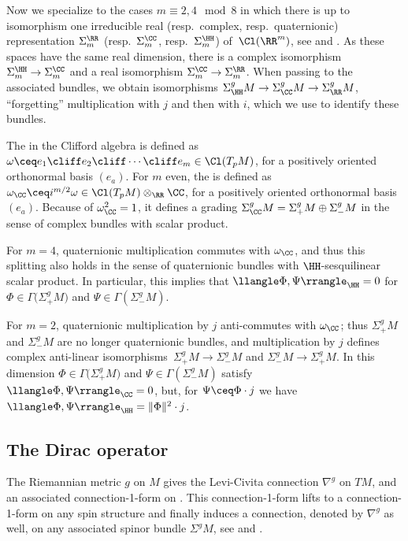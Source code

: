 Now we specialize to the cases $m\equiv 2,4\mod 8$ in which there is up to isomorphism one irreducible real (resp.\ complex, resp.\ quaternionic) representation $\Sigma^\RR_m$ \big(resp.\ $\Sigma^\CC_m$, resp.\ $\Sigma^\HH_m$\big) of~$\Cl(\RR^m)$, see \cite[Chapter~I, Section~5]{lawson.michelsohn:89} and \cite[Section~1.7]{friedrich-book}. As these spaces have the same real dimension, there is a complex isomorphism $\Sigma^\HH_m\to \Sigma^\CC_m$ and a real isomorphism $\Sigma^\CC_m\to \Sigma^\RR_m$. When passing to the associated bundles, we obtain isomorphisms $\Sigma^g_\HH M\to \Sigma^g_\CC M\to \Sigma^g_\RR M$,
``forgetting'' multiplication with $ j $ and then with $ i $, which we use to identify these bundles.

The  in the Clifford algebra is defined as $\omega\ceq e_1\cliff e_2\cliff \cdots\cliff e_m\in \Cl(T_pM)$, for a positively oriented orthonormal basis $(e_a)$. For $m$ even, the  is defined as $\omega_\CC\ceq i ^{m/2} \omega \in \Cl(T_pM)\otimes_\RR\CC$, for a positively oriented orthonormal basis $(e_a)$. Because of $\omega_\CC^2=1$, it defines a grading $\Sigma^g_\CC M = \Sigma^g_+ M\oplus \Sigma^g_-M$ in the sense of complex bundles with scalar product.

For $m=4$, quaternionic multiplication commutes with $\omega_\CC$, and thus this splitting also holds in the sense of quaternionic bundles with $\HH$-sesquilinear scalar product. In particular, this implies that $\llangle\Phi,\Psi\rrangle_\HH=0$ for $\Phi\in \Gamma\bigl(\Sigma^g_+ M\bigr)$ and $\Psi\in \Gamma(\Sigma^g_- M)$.

For $m=2$, quaternionic multiplication by $ j $ anti-commutes with $\omega_\CC$; thus $\Sigma^g_+ M$ and $\Sigma^g_-M$ are no longer quaternionic bundles, and multiplication by $ j $ defines complex anti-linear isomorphisms~${\Sigma^g_+ M\to \Sigma^g_-M}$ and $\Sigma^g_- M\to \Sigma^g_+M$. In this dimension $\Phi\in \Gamma\bigl(\Sigma^g_+ M\bigr)$ and $\Psi\in \Gamma(\Sigma^g_- M)$ satisfy $\llangle\Phi,\Psi\rrangle_\CC=0$, but, \eg for $\Psi\ceq \Phi\cdot j $ we have $\llangle\Phi,\Psi\rrangle_\HH= \|\Phi\|^2\cdot j $.

\subsection{The Dirac operator}

The Riemannian metric $g$ on $M$ gives the Levi-Civita connection $\nabla^g$ on $TM$, and an associated connection-1-form on . This connection-1-form lifts to a connection-1-form on any spin structure  and finally induces a connection, denoted by $\nabla^g$ as well, on any associated spinor bundle $\Sigma^g M$, see \cite[Chaper~II, Section~4]{lawson.michelsohn:89} and \cite[Section~3.1]{friedrich-book}.

